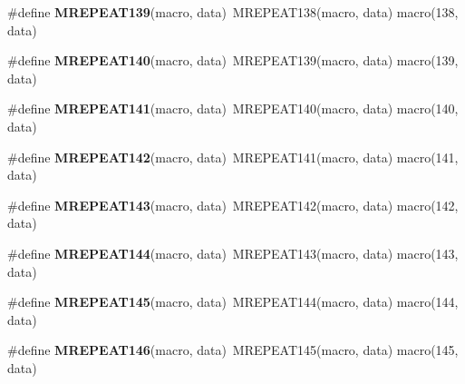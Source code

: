 \begin{DoxyCompactItemize}
\item 
\hypertarget{group__group__xmega__utils__mrepeat_gaec99878cdc5458427287a040044924d3}{\#define {\bfseries M\-R\-E\-P\-E\-A\-T139}(macro, data)~M\-R\-E\-P\-E\-A\-T138(macro, data)   macro(138, data)}\label{group__group__xmega__utils__mrepeat_gaec99878cdc5458427287a040044924d3}

\item 
\hypertarget{group__group__xmega__utils__mrepeat_ga040d95ace740614458cf565fe5cd29f4}{\#define {\bfseries M\-R\-E\-P\-E\-A\-T140}(macro, data)~M\-R\-E\-P\-E\-A\-T139(macro, data)   macro(139, data)}\label{group__group__xmega__utils__mrepeat_ga040d95ace740614458cf565fe5cd29f4}

\item 
\hypertarget{group__group__xmega__utils__mrepeat_gad51aaacf4994383b35e14ed4b6d6c4b0}{\#define {\bfseries M\-R\-E\-P\-E\-A\-T141}(macro, data)~M\-R\-E\-P\-E\-A\-T140(macro, data)   macro(140, data)}\label{group__group__xmega__utils__mrepeat_gad51aaacf4994383b35e14ed4b6d6c4b0}

\item 
\hypertarget{group__group__xmega__utils__mrepeat_ga6177414b6882cdd46b50b679a3cfb927}{\#define {\bfseries M\-R\-E\-P\-E\-A\-T142}(macro, data)~M\-R\-E\-P\-E\-A\-T141(macro, data)   macro(141, data)}\label{group__group__xmega__utils__mrepeat_ga6177414b6882cdd46b50b679a3cfb927}

\item 
\hypertarget{group__group__xmega__utils__mrepeat_ga6f4bd791a6e9e20406ebf8a1ba70d3e7}{\#define {\bfseries M\-R\-E\-P\-E\-A\-T143}(macro, data)~M\-R\-E\-P\-E\-A\-T142(macro, data)   macro(142, data)}\label{group__group__xmega__utils__mrepeat_ga6f4bd791a6e9e20406ebf8a1ba70d3e7}

\item 
\hypertarget{group__group__xmega__utils__mrepeat_ga02a2c148781cd12ab2a14368078ed3ed}{\#define {\bfseries M\-R\-E\-P\-E\-A\-T144}(macro, data)~M\-R\-E\-P\-E\-A\-T143(macro, data)   macro(143, data)}\label{group__group__xmega__utils__mrepeat_ga02a2c148781cd12ab2a14368078ed3ed}

\item 
\hypertarget{group__group__xmega__utils__mrepeat_gaf589b0dcb9d280437d5f44216096cb09}{\#define {\bfseries M\-R\-E\-P\-E\-A\-T145}(macro, data)~M\-R\-E\-P\-E\-A\-T144(macro, data)   macro(144, data)}\label{group__group__xmega__utils__mrepeat_gaf589b0dcb9d280437d5f44216096cb09}

\item 
\hypertarget{group__group__xmega__utils__mrepeat_gab1dc20a39d993d2afbf5e0cb8ebe91a0}{\#define {\bfseries M\-R\-E\-P\-E\-A\-T146}(macro, data)~M\-R\-E\-P\-E\-A\-T145(macro, data)   macro(145, data)}\label{group__group__xmega__utils__mrepeat_gab1dc20a39d993d2afbf5e0cb8ebe91a0}


\end{DoxyCompactItemize}
